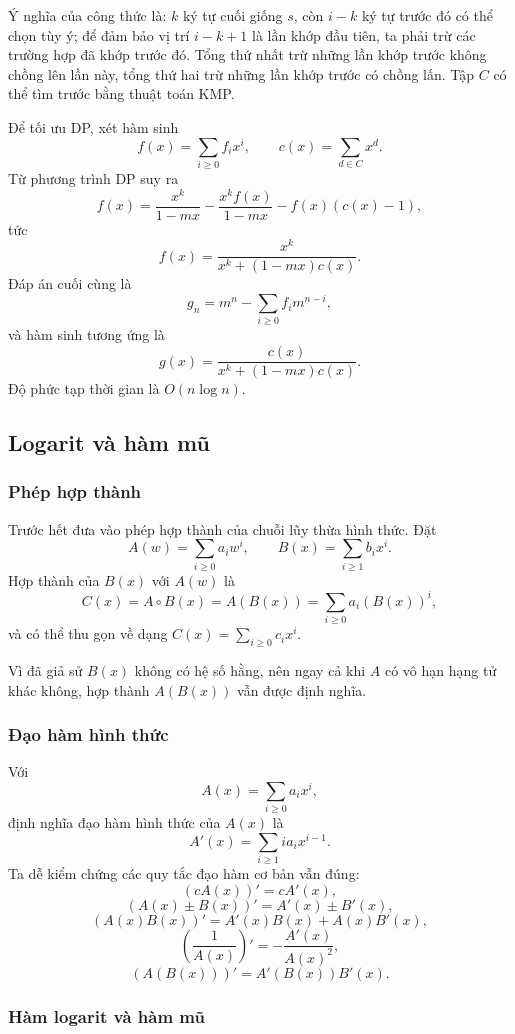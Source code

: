 \documentclass[11pt]{article}
\begin{document}
Ý nghĩa của công thức là: \(k\) ký tự cuối giống \(s\), còn \(i-k\) ký tự trước
đó có thể chọn tùy ý; để đảm bảo vị trí \(i-k+1\) là lần khớp đầu tiên, ta phải
trừ các trường hợp đã khớp trước đó. Tổng thứ nhất trừ những lần khớp trước
không chồng lên lần này, tổng thứ hai trừ những lần khớp trước có chồng lấn.
Tập \(C\) có thể tìm trước bằng thuật toán KMP.

Để tối ưu DP, xét hàm sinh
\[
  f(x)=\sum_{i\ge 0} f_i x^i,\qquad
  c(x)=\sum_{d\in C}x^d.
\]
Từ phương trình DP suy ra
\[
  f(x)=\frac{x^k}{1-mx}-\frac{x^k f(x)}{1-mx}-f(x)(c(x)-1),
\]
tức
\[
  f(x)=\frac{x^k}{x^k+(1-mx)c(x)}.
\]
Đáp án cuối cùng là
\[
  g_n=m^n-\sum_{i\ge 0}f_i m^{n-i},
\]
và hàm sinh tương ứng là
\[
  g(x)=\frac{c(x)}{x^k+(1-mx)c(x)}. \tag{5.5}
\]
Độ phức tạp thời gian là \(O(n\log n)\).

\subsection{Logarit và hàm mũ}

\subsubsection{Phép hợp thành}

Trước hết đưa vào phép hợp thành của chuỗi lũy thừa hình thức. Đặt
\[
  A(w)=\sum_{i\ge 0}a_iw^i,\qquad
  B(x)=\sum_{i\ge 1}b_i x^i.
\]
Hợp thành của \(B(x)\) với \(A(w)\) là
\[
  C(x)=A\circ B(x)=A(B(x))=\sum_{i\ge 0}a_i(B(x))^i, \tag{6.1}
\]
và có thể thu gọn về dạng \(C(x)=\sum_{i\ge 0}c_i x^i\).

Vì đã giả sử \(B(x)\) không có hệ số hằng, nên ngay cả khi \(A\) có vô hạn hạng
tử khác không, hợp thành \(A(B(x))\) vẫn được định nghĩa.

\subsubsection{Đạo hàm hình thức}

Với
\[
  A(x)=\sum_{i\ge 0}a_i x^i,
\]
định nghĩa đạo hàm hình thức của \(A(x)\) là
\[
  A'(x)=\sum_{i\ge 1}ia_i x^{i-1}. \tag{6.2}
\]
Ta dễ kiểm chứng các quy tắc đạo hàm cơ bản vẫn đúng:
\[
  (cA(x))'=cA'(x), \tag{6.3}
\]
\[
  (A(x)\pm B(x))'=A'(x)\pm B'(x), \tag{6.4}
\]
\[
  (A(x)B(x))'=A'(x)B(x)+A(x)B'(x), \tag{6.5}
\]
\[
  \left(\frac1{A(x)}\right)'=-\frac{A'(x)}{A(x)^2}, \tag{6.6}
\]
\[
  (A(B(x)))'=A'(B(x))B'(x). \tag{6.7}
\]

\subsubsection{Hàm logarit và hàm mũ}
\end{document}
